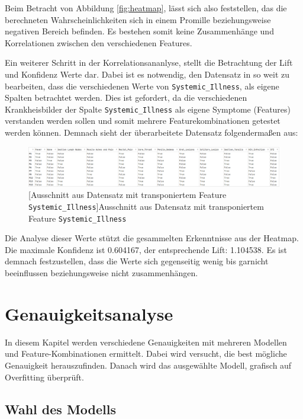 \documentclass[13pt,a4paper, listof=entryprefix, bibliography=totocnumbered,toc=listofnumbered,lof=listofnumbered]{scrartcl}
\begin{document}
	Beim Betracht von Abbildung \ref{fig:heatmap}, lässt sich also feststellen, das die berechneten Wahrscheinlichkeiten sich in einem Promille beziehungsweise 
	negativen Bereich befinden. Es bestehen somit keine Zusammenhänge und Korrelationen zwischen den verschiedenen Features. 

	Ein weiterer Schritt in der Korrelationsananlyse, stellt die Betrachtung der Lift und Konfidenz Werte dar. Dabei ist es notwendig, den 
	Datensatz in so weit zu bearbeiten, dass die verschiedenen Werte von \lstinline{Systemic_Illness}, als eigene Spalten betrachtet werden. 
	Dies ist gefordert, da die verschiedenen Krankheisbilder der Spalte \lstinline{Systemic_Illness} als eigene Symptome (Features) verstanden werden sollen und somit mehrere Featurekombinationen 
	getestet werden können. Demnach sieht der überarbeitete Datensatz folgendermaßen aus: 

	\begin{figure}[H]
		\centering
		\includegraphics[width=0.8\linewidth]{Bilder/tranp_df.png}
		[Ausschnitt aus Datensatz mit transponiertem Feature \lstinline{Systemic_Illness}]{Ausschnitt aus Datensatz mit transponiertem Feature \lstinline{Systemic_Illness}}
		\label{fig:transp_feature}
	\end{figure}

	Die Analyse dieser Werte stützt die gesammelten Erkenntnisse aus der Heatmap. Die maximale Konfidenz ist 0.604167, der entsprechende Lift:
	1.104538. Es ist demnach festzustellen, dass die Werte sich gegenseitig wenig bis garnicht beeinflussen beziehungsweise nicht zusammenhängen. 


	\section{Genauigkeitsanalyse}
		\label{ch:genauigkeit_analyse}

	In diesem Kapitel werden verschiedene Genauigkeiten mit mehreren Modellen und Feature-Kombinationen ermittelt. Dabei wird versucht, die best mögliche Genauigkeit herauszufinden. 
	Danach wird das ausgewählte Modell, grafisch auf Overfitting überprüft.  

	\subsection{Wahl des Modells}
		\label{ch:wahl_modell}
\end{document}
